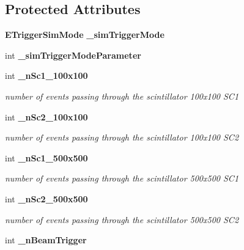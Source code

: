 \subsection*{Protected Attributes}
\begin{DoxyCompactItemize}
\item 
{\bf E\-Trigger\-Sim\-Mode} {\bfseries \-\_\-sim\-Trigger\-Mode}\label{classCALICE_1_1Ahc2TriggerSim_a9ae476f2767aac3277f781e47e356643}

\item 
int {\bfseries \-\_\-sim\-Trigger\-Mode\-Parameter}\label{classCALICE_1_1Ahc2TriggerSim_a579a9908f65019aec5435ec3c8c4006f}

\item 
int {\bf \-\_\-n\-Sc1\-\_\-100x100}\label{classCALICE_1_1Ahc2TriggerSim_af0b85f62b857567d2ad97362ad867944}

\begin{DoxyCompactList}\small\item\em number of events passing through the scintillator 100x100 S\-C1 \end{DoxyCompactList}\item 
int {\bf \-\_\-n\-Sc2\-\_\-100x100}\label{classCALICE_1_1Ahc2TriggerSim_a62c9633a37533c1454a674227e1adbfe}

\begin{DoxyCompactList}\small\item\em number of events passing through the scintillator 100x100 S\-C2 \end{DoxyCompactList}\item 
int {\bf \-\_\-n\-Sc1\-\_\-500x500}\label{classCALICE_1_1Ahc2TriggerSim_ad7c0a48243f57169f5f52a702bf1d0e1}

\begin{DoxyCompactList}\small\item\em number of events passing through the scintillator 500x500 S\-C1 \end{DoxyCompactList}\item 
int {\bf \-\_\-n\-Sc2\-\_\-500x500}\label{classCALICE_1_1Ahc2TriggerSim_a7d0a9227eecfed359175b1d5738b4ecf}

\begin{DoxyCompactList}\small\item\em number of events passing through the scintillator 500x500 S\-C2 \end{DoxyCompactList}\item 
int {\bf \-\_\-n\-Beam\-Trigger}\label{classCALICE_1_1Ahc2TriggerSim_a744848f19b893adba50bf589ca642f86}


\end{DoxyCompactItemize}
